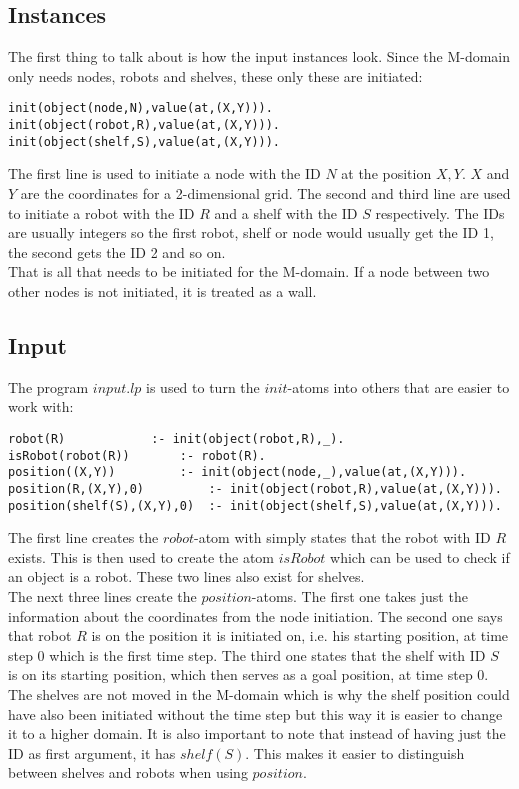 \documentclass[runningheads]{llncs}
\begin{document}
\subsection{Instances}
The first thing to talk about is how the input instances look. Since the M-domain only needs nodes, robots and shelves, these only these are initiated:
\begin{verbatim}
init(object(node,N),value(at,(X,Y))).
init(object(robot,R),value(at,(X,Y))).
init(object(shelf,S),value(at,(X,Y))).
\end{verbatim}
The first line is used to initiate a node with the ID $N$ at the position $X,Y$. $X$ and $Y$ are the coordinates for a 2-dimensional grid. The second and third line are used to initiate a robot with the ID $R$ and a shelf with the ID $S$ respectively. The IDs are usually integers so the first robot, shelf or node would usually get the ID 1, the second gets the ID 2 and so on. \\
That is all that needs to be initiated for the M-domain. If a node between two other nodes is not initiated, it is treated as a wall.
\subsection{Input}
The program $input.lp$ is used to turn the $init$-atoms into others that are easier to work with:
\begin{verbatim}
robot(R) 			:- init(object(robot,R),_).
isRobot(robot(R)) 		:- robot(R).
position((X,Y))   		:- init(object(node,_),value(at,(X,Y))).
position(R,(X,Y),0) 		:- init(object(robot,R),value(at,(X,Y))).
position(shelf(S),(X,Y),0)	:- init(object(shelf,S),value(at,(X,Y))).
\end{verbatim}
The first line creates the $robot$-atom with simply states that the robot with ID $R$ exists. This is then used to create the atom $isRobot$ which can be used to check if an object is a robot. These two lines also exist for shelves. \\
The next three lines create the $position$-atoms. The first one takes just the information about the coordinates from the node initiation. The second one says that robot $R$ is on the position it is initiated on, i.e. his starting position, at time step 0 which is the first time step. The third one states that the shelf with ID $S$ is on its starting position, which then serves as a goal position, at time step 0. The shelves are not moved in the M-domain which is why the shelf position could have also been initiated without the time step but this way it is easier to change it to a higher domain. It is also important to note that instead of having just the ID as first argument, it has $shelf(S)$. This makes it easier to distinguish between shelves and robots when using $position$.
\end{document}
